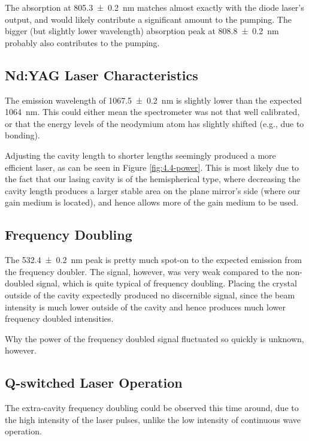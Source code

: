 \documentclass[a4paper]{scrartcl}
\begin{document}
The absorption at \SI{805.3 \pm 0.2}{\nano\metre} matches almost exactly with the diode laser's output, and would likely contribute a significant amount to the pumping. The bigger (but slightly lower wavelength) absorption peak at \SI{808.8 \pm 0.2}{\nano\metre} probably also contributes to the pumping.

\subsection{Nd:YAG Laser Characteristics}
The emission wavelength of \SI{1067.5 \pm 0.2}{\nano\metre} is slightly lower than the expected \SI{1064}{\nano\metre}. This could either mean the spectrometer was not that well calibrated, or that the energy levels of the neodymium atom has slightly shifted (e.g., due to bonding).

Adjusting the cavity length to shorter lengths seemingly produced a more efficient laser, as can be seen in Figure \ref{fig:4.4-power}. This is most likely due to the fact that our lasing cavity is of the hemispherical type, where decreasing the cavity length produces a larger stable area on the plane mirror's side (where our gain medium is located), and hence allows more of the gain medium to be used.

\subsection{Frequency Doubling}
The \SI{532.4 \pm 0.2}{\nano\metre} peak is pretty much spot-on to the expected emission from the frequency doubler. The signal, however, was very weak compared to the non-doubled signal, which is quite typical of frequency doubling. Placing the crystal outside of the cavity expectedly produced no discernible signal, since the beam intensity is much lower outside of the cavity and hence produces much lower frequency doubled intensities.

Why the power of the frequency doubled signal fluctuated so quickly is unknown, however.

\subsection{Q-switched Laser Operation}
The extra-cavity frequency doubling could be observed this time around, due to the high intensity of the laser pulses, unlike the low intensity of continuous wave operation.
\end{document}
